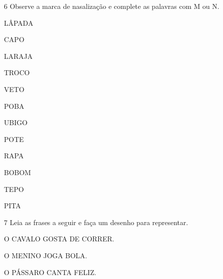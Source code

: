 \num{6} Observe a marca de nasalização e complete as palavras com M ou N.

\vspace*{+1em}


\begin{multicols}{2}
LÂPADA

CAPO

LARAJA

TROCO

VETO

POBA

UBIGO

POTE

RAPA

BOBOM

TEPO

PITA
\end{multicols}

\num{7} Leia as frases a seguir e faça um desenho para representar.


\begin{myquote}
\centering
O CAVALO GOSTA DE CORRER.
\end{myquote}

\begin{mdframed}[linewidth=2pt,linecolor=salmao]
\vspace{7,5cm}
\end{mdframed}

\begin{myquote}
\centering
O MENINO JOGA BOLA.
\end{myquote}

\begin{mdframed}[linewidth=2pt,linecolor=salmao]
\vspace{7,5cm}
\end{mdframed}

\begin{myquote}
\centering
O PÁSSARO CANTA FELIZ.
\end{myquote}

